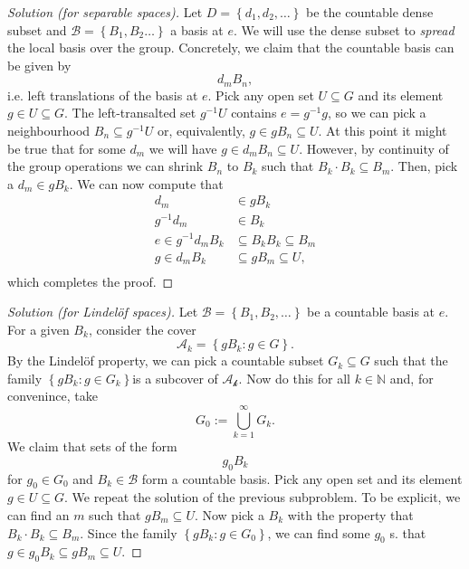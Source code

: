 \begin{proof}[Solution (for separable spaces)]
    Let \( D = \left\{ d_1, d_2, \ldots \right\} \) be the countable dense subset and \( \mathcal{B} = \left\{ B_1, B_2 \ldots \right\} \) a basis at \( e \). We will use the dense subset to \emph{spread} the local basis over the group. Concretely, we claim that the countable basis can be given by
    \[ 
       d_m B_n,
   \]
   i.e. left translations of the basis at \( e \). Pick any open set \( U \subseteq G \) and its element \( g \in U \subseteq G \). The left-transalted set \( g^{-1}U \) contains \( e = g^{-1}g \), so we can pick a neighbourhood \( B_n \subseteq g^{-1}U \) or, equivalently, \( g \in gB_n \subseteq U \).
   At this point it might be true that for some \( d_m \) we will have \( g \in d_mB_n \subseteq U \). However, by continuity of the group operations we can shrink \( B_n \) to \( B_k \) such that \( B_k \cdot B_k \subseteq B_m \). Then, pick a \( d_m \in gB_k \). We can now compute that
\begin{align*}
    d_m &\in gB_k  \\
    g^{-1}d_m &\in B_k \\
    e \in g^{-1}d_mB_k &\subseteq B_kB_k \subseteq B_m \\
    g \in d_mB_k &\subseteq gB_m \subseteq U, \\
\end{align*}
which completes the proof.
\end{proof}

\begin{proof}[Solution (for Lindel\"of spaces)]
    Let \( \mathcal{B} = \left\{ B_1, B_2, \ldots \right\} \) be a countable basis at \( e \). For a given \( B_k \), consider the cover
    \[ 
       \mathcal{A}_k = \left\{ gB_k : g \in G \right\}.
   \]
   By the Lindel\"of property, we can pick a countable subset \( G_k \subseteq G \) such that the family \( \left\{ gB_k : g \in G_k \right\} \)is a subcover of \( \mathcal{A_k} \). Now do this for all \( k \in \mathbb{N} \) and, for convenince, take
   \[ 
       G_0 := \bigcup_{k=1}^\infty G_k. 
  \]
  We claim that sets of the form
  \[ 
     g_0B_k 
 \]
 for \( g_0 \in G_0 \) and \( B_k \in \mathcal{B} \) form a countable basis. Pick any open set and its element \( g \in U \subseteq G \). We repeat the solution of the previous subproblem. To be explicit, we can find an \( m \) such that \( gB_m \subseteq U \). Now pick a \( B_k \) with the property that \( B_k \cdot B_k \subseteq B_m \). Since the family \( \left\{ gB_k : g \in G_0 \right\} \), we can find some \( g_0 \) s. that \( g \in g_0B_k \subseteq gB_m \subseteq U \).
\end{proof}

